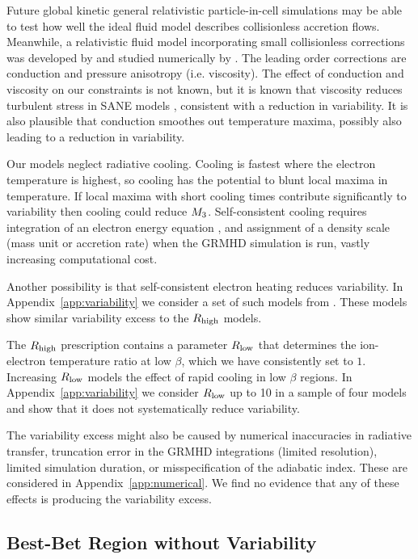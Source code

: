 Future global kinetic general relativistic particle-in-cell simulations may be able to test how well the ideal fluid model describes collisionless accretion flows.
Meanwhile, a relativistic fluid model incorporating small collisionless corrections was developed by \citet{2015ApJ...810..162C} and studied numerically by \citet{2017MNRAS.470.2240F}.
The leading order corrections are conduction and pressure anisotropy (i.e. viscosity).
The effect of conduction and viscosity on our constraints is not known, but it is known that viscosity reduces turbulent stress in SANE models \citep{2017MNRAS.470.2240F}, consistent with a reduction in variability.
It is also plausible that conduction smoothes out temperature maxima, possibly also leading to a reduction in variability.

Our models neglect radiative cooling.
Cooling is fastest where the electron temperature is highest, so cooling has the potential to blunt  local maxima in temperature.
If local maxima with short cooling times contribute significantly to variability then cooling could reduce $M_{3}$.
Self-consistent cooling requires integration of an electron energy equation \citep[e.g.][]{2015MNRAS.454.1848R}, and assignment of a density scale (mass unit or accretion rate) when the GRMHD simulation is run, vastly increasing computational cost.

Another possibility is that self-consistent electron heating reduces variability.
In Appendix~\ref{app:variability} we consider a set of such models from \citet{2020MNRAS.494.4168D}.
These models show similar variability excess to the $R_\mathrm{high}$ models.

The $R_\mathrm{high}$ prescription contains a parameter $R_\mathrm{low}$ that determines the ion-electron temperature ratio at low $\beta$, which we have consistently set to $1$.
Increasing $R_\mathrm{low}$ models the effect of rapid cooling in low $\beta$ regions.
In Appendix~\ref{app:variability} we consider $R_\mathrm{low}$ up to 10 in a sample of four models and show that it does not systematically reduce variability.

The variability excess might also be caused by numerical inaccuracies in radiative transfer, truncation error in the GRMHD integrations (limited resolution), limited simulation duration, or misspecification of the adiabatic index.
These are considered in Appendix~\ref{app:numerical}.
We find no evidence that any of these effects is producing the variability excess.

\subsection{Best-Bet Region without Variability}


